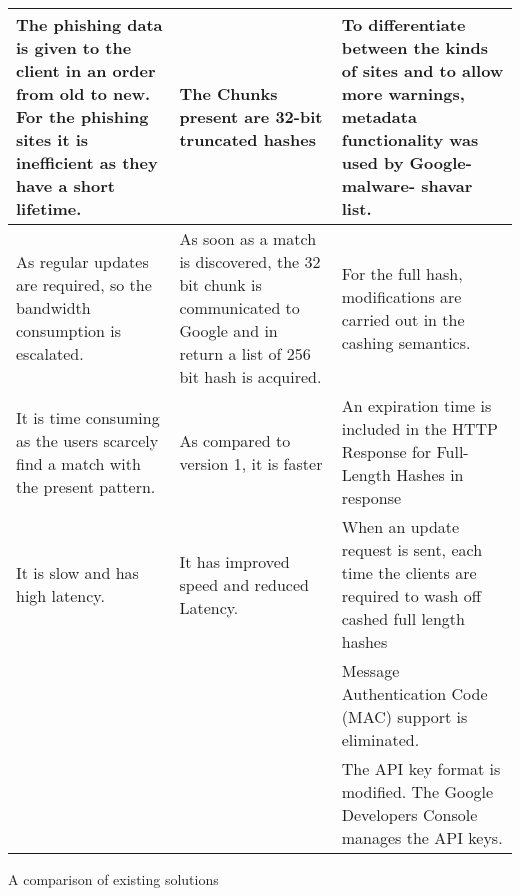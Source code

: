 \begin{singlespace}
\begin{center}
\begin{tabular}{ | m{13em} | m{13em} | m{13em} | }
			\hline
			The phishing data is given to the client in
			an order from old to new. For the
			phishing sites it is inefficient as they
			have a short lifetime.                 & The Chunks present are 32-bit
			truncated hashes                       & To differentiate between the kinds of sites and
			to allow more warnings, metadata
			functionality was used by Google-malware-
			shavar list.                                                                                                                           \\
			\hline
			As regular updates are required, so the
			bandwidth consumption is escalated.    & As soon as a match is discovered,
			the 32 bit chunk is
			communicated to Google and in
			return a list of 256 bit hash is
			acquired.                              & For the full hash, modifications are carried out
			in the cashing semantics.                                                                                                              \\
			\hline

			It is time consuming as the users scarcely
			find a match with the present pattern. & As compared to version 1, it is
			faster                                 & An expiration time is included in the HTTP
			Response for Full-Length Hashes in
			response                                                                                                                               \\
			\hline

			It is slow and has high latency.       & It has improved speed and reduced
			Latency.                               & When an update request is sent, each time the
			clients are required to wash off cashed full
			length hashes                                                                                                                          \\
			\hline

			                                       &                                                  & Message Authentication Code (MAC) support
			is eliminated.                                                                                                                         \\
			\hline

			                                       &                                                  & The API key format is modified. The Google
			Developers Console manages the API keys.                                                                                               \\
			\hline
		\end{tabular}
		\captionsetup{type=table}\caption{A comparison of existing solutions \citep{INTELLIGENT_PHISHING_ANFIS}}
	\end{center}
\end{singlespace}


